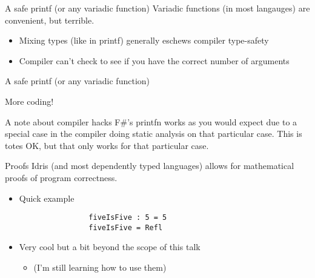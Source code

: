 \documentclass{beamer}
\begin{document}
\begin{frame}{A safe printf (or any variadic function)}
	\transdissolve[duration=0.17]
	Variadic functions (in most langauges) are convenient, but terrible.
	\begin{itemize}
	  \pause
          \item Mixing types (like in printf) generally eschews compiler type-safety
	  \pause
	  \item Compiler can't check to see if you have the correct number of arguments
	\end{itemize}
\end{frame}
\begin{frame}{A safe printf (or any variadic function)}
	\transdissolve[duration=0.17]
	\begin{center} 
	  More coding!
	\end{center}
\end{frame}
\begin{frame}{A note about compiler hacks}
 		\transdissolve
  F\#'s printfn works as you would expect due to a special case in the compiler doing static analysis on that particular case. 
  \linebreak
  \linebreak
  \pause
  This is totes OK, but that only works for that particular case.
\end{frame}
\begin{frame}[fragile]{Proofs}
	\transdissolve[duration=0.17]
	Idris (and most dependently typed languages) allows for mathematical proofs of program correctness. 
	\begin{itemize}
		\pause
		\item Quick example
			\begin{lstlisting}
				fiveIsFive : 5 = 5
				fiveIsFive = Refl
			\end{lstlisting}

		\pause
		\item Very cool but a bit beyond the scope of this talk \begin{itemize} 
				\pause
				\item (I'm still learning how to use them)
			\end{itemize}
	\end{itemize}
\end{frame}
\end{document}
